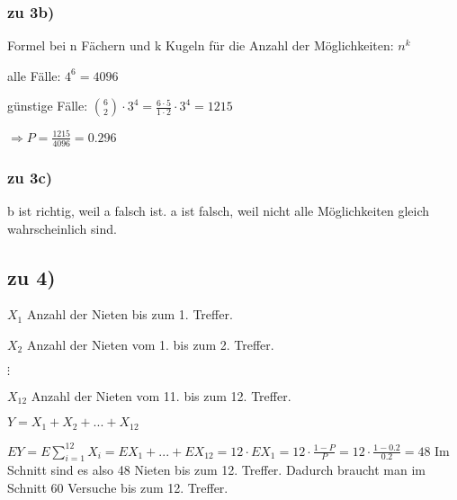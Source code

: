 \subsubsection{zu 3b)}
Formel bei n Fächern und k Kugeln für die Anzahl der Möglichkeiten: $ n^k $

alle Fälle: $4^6 = 4096 $

günstige Fälle: $ \binom 6 2 \cdot 3^4 = \frac{6\cdot 5}{1\cdot 2} \cdot 3^4 = 1215 $   

$\Rightarrow P = \frac{1215}{4096} = 0.296$

\subsubsection{zu 3c)}
b ist richtig, weil a falsch ist. a ist falsch, weil nicht alle Möglichkeiten gleich wahrscheinlich sind. 

\subsection{zu 4)}
$ X_1 $ Anzahl der Nieten bis zum 1. Treffer. 

$ X_2 $ Anzahl der Nieten vom 1. bis zum 2. Treffer. 

$ \vdots $

$ X_{12} $ Anzahl der Nieten vom 11. bis zum 12. Treffer. 

$ Y = X_1 + X_2 + ... + X_{12}$

$EY = E \sum_{i=1}^{12} X_i = EX_1 + ... + EX_{12} = 12\cdot EX_1 = 12 \cdot \frac{1-P}{P} = 12\cdot \frac{1-0.2}{0.2} = 48$ 
Im Schnitt sind es also 48 Nieten bis zum 12. Treffer. Dadurch braucht man im Schnitt 60 Versuche bis zum 12. Treffer. 



